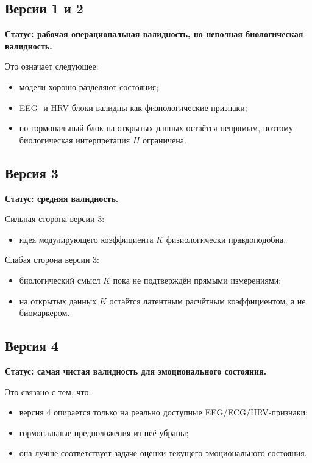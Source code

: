 \documentclass[12pt,a4paper]{article}
\begin{document}
\subsection{Версии 1 и 2}
\textbf{Статус: рабочая операциональная валидность, но неполная биологическая валидность.}

Это означает следующее:
\begin{itemize}[leftmargin=1.25cm]
    \item модели хорошо разделяют состояния;
    \item EEG- и HRV-блоки валидны как физиологические признаки;
    \item но гормональный блок на открытых данных остаётся непрямым, поэтому биологическая интерпретация $H$ ограничена.
\end{itemize}

\subsection{Версия 3}
\textbf{Статус: средняя валидность.}

Сильная сторона версии 3:
\begin{itemize}[leftmargin=1.25cm]
    \item идея модулирующего коэффициента $K$ физиологически правдоподобна.
\end{itemize}

Слабая сторона версии 3:
\begin{itemize}[leftmargin=1.25cm]
    \item биологический смысл $K$ пока не подтверждён прямыми измерениями;
    \item на открытых данных $K$ остаётся латентным расчётным коэффициентом, а не биомаркером.
\end{itemize}

\subsection{Версия 4}
\textbf{Статус: самая чистая валидность для эмоционального состояния.}

Это связано с тем, что:
\begin{itemize}[leftmargin=1.25cm]
    \item версия 4 опирается только на реально доступные EEG/ECG/HRV-признаки;
    \item гормональные предположения из неё убраны;
    \item она лучше соответствует задаче оценки текущего эмоционального состояния.
\end{itemize}
\end{document}
